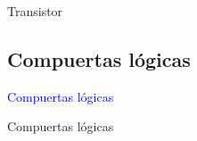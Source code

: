 \documentclass[10pt,xcolor={dvipsnames}]{beamer}
\begin{document}
\begin{frame}{Transistor}
\begin{center}
\end{center}
\end{frame}

\subsection{Compuertas lógicas}

\begin{frame}
\begin{center}
\Huge{\textcolor{blue}{Compuertas lógicas}}
\end{center}
\end{frame}

\begin{frame}{Compuertas lógicas}
\begin{center}

\end{center}
\end{frame}
\end{document}
